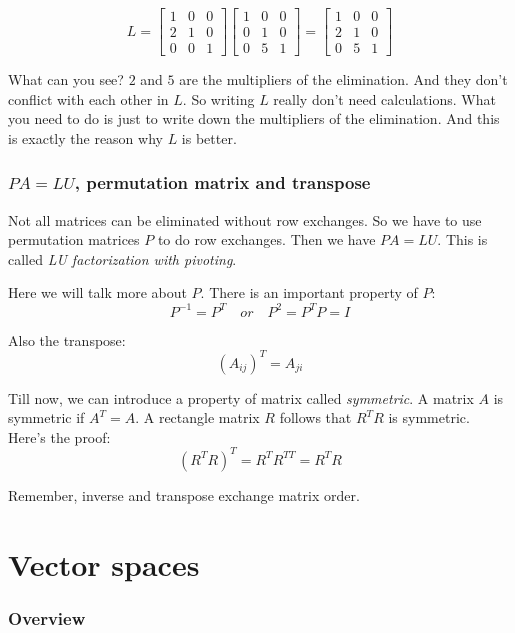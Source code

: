 \documentclass[10pt,a4paper,oneside,numbers=noenddot]{scrbook}
\theoremstyle{ctplain}
\theoremstyle{ctresult}
\begin{document}
\[
  L = \begin{bmatrix}
    1 & 0 & 0 \\
    2 & 1 & 0 \\
    0 & 0 & 1
  \end{bmatrix}
  \begin{bmatrix}
    1 & 0 & 0 \\
    0 & 1 & 0 \\
    0 & 5 & 1
  \end{bmatrix}
  =
  \begin{bmatrix}
    1 & 0 & 0 \\
    2 & 1 & 0 \\
    0 & 5 & 1
  \end{bmatrix}
\]

What can you see? $2$ and $5$ are the multipliers of the elimination. And they don't
conflict with each other in $L$. So writing $L$ really don't need calculations. What
you need to do is just to write down the multipliers of the elimination. And this is
exactly the reason why $L$ is better.

\subsection{$PA = LU$, permutation matrix and transpose}

Not all matrices can be eliminated without row exchanges. So we have to use permutation
matrices $P$ to do row exchanges. Then we have $PA = LU$. This is called \emph{LU
factorization with pivoting}.

Here we will talk more about $P$. There is an important property of $P$:
\[
  P^{-1} = P^{T} \quad or \quad P^{2} = P^{T}P = I
\]

Also the transpose:
\[
  (A_{ij})^{T} = A_{ji}
\]

Till now, we can introduce a property of matrix called \emph{symmetric}. A matrix $A$
is symmetric if $A^{T} = A$. A rectangle matrix $R$ follows that $R^{T}R$ is symmetric.
Here's the proof:
\[
  (R^{T}R)^{T} = R^{T}R^{TT} = R^{T}R
\]

Remember, inverse and transpose exchange matrix order.

\chapter{Vector spaces}

\subsection*{Overview}
\end{document}
